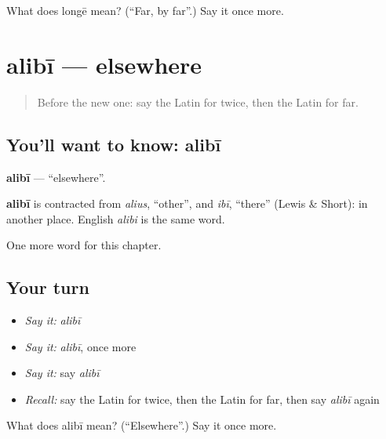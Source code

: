 \begin{tcolorbox}[breakable,colback=teal!4,colframe=teal!35!black,title={Before you move on}]
What does longē mean? (\textquotedblleft{}Far, by far\textquotedblright{}.) Say it once more.
\end{tcolorbox}
\section[alibī]{alibī — elsewhere}

\label{lesson:LA-C177-alibi}



\begin{quote}
Before the new one: say the Latin for twice, then the Latin for far.
\end{quote}

\subsection*{You'll want to know: alibī}
\textbf{alibī} — \textquotedblleft{}elsewhere\textquotedblright{}.

\begin{cousinweb}
\textbf{alibī} is contracted from \emph{alius}, \textquotedblleft{}other\textquotedblright{}, and \emph{ibī}, \textquotedblleft{}there\textquotedblright{} (Lewis \& Short): in another place. English \emph{alibi} is the same word.
\end{cousinweb}

\begin{grammarlens}[title={What you've built}]
One more word for this chapter.
\end{grammarlens}

\subsection*{Your turn}
\begin{itemize}
\raggedright
  \item \emph{Say it:} \emph{alibī}
  \item \emph{Say it:} \emph{alibī}, once more
  \item \emph{Say it:} say \emph{alibī}
  \item \emph{Recall:} say the Latin for twice, then the Latin for far, then say \emph{alibī} again
\end{itemize}

\begin{tcolorbox}[breakable,colback=teal!4,colframe=teal!35!black,title={Before you move on}]
What does alibī mean? (\textquotedblleft{}Elsewhere\textquotedblright{}.) Say it once more.
\end{tcolorbox}
